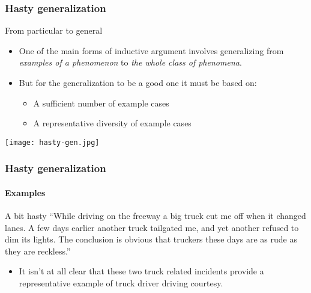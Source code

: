 \documentclass[10pt,letterpaper,xcolor=dvipsnames]{beamer}
\begin{document}
\begin{frame}
  \frametitle{Hasty generalization}
  
  \begin{block}{From particular to general}
    \begin{itemize}
      \item One of the main forms of inductive argument involves generalizing from \textit{examples of a phenomenon} to \textit{the whole class of phenomena}.
      \item But for the generalization to be a good one it must be based on:
      \begin{itemize}
        \item A sufficient number of example cases
        \item A representative diversity of example cases
      \end{itemize}
    \end{itemize}
  \end{block}
  
  \begin{center}
    \texttt{[image: hasty-gen.jpg]}
  \end{center}
  
\end{frame}

\begin{frame}
  \frametitle{Hasty generalization}
  \framesubtitle{Examples}
  
  \begin{block}{A bit hasty}
    ``While driving on the freeway a big truck cut me off when it changed lanes.  A few days earlier another truck tailgated me, and yet another refused to dim its lights.  The conclusion is obvious that truckers these days are as rude as they are reckless.''
  \end{block}
  
  \begin{itemize}
    \item<2-> It isn't at all clear that these two truck related incidents provide a representative example of truck driver driving courtesy.
  \end{itemize}
\end{frame}
\end{document}
